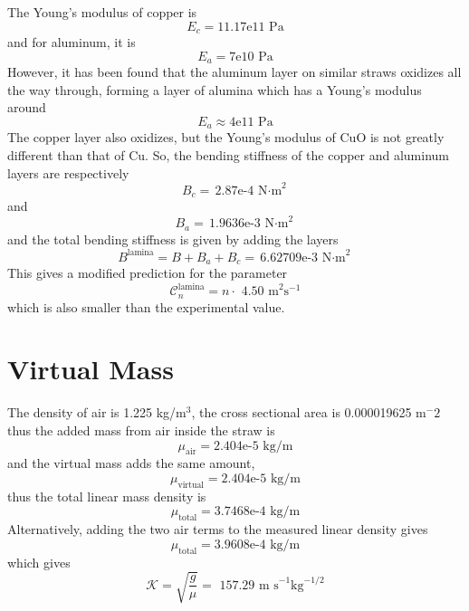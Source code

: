 \documentclass[twoside]{article}
\begin{document}
\begin{multicols}{2}
The Young's modulus of copper is
\begin{equation}
E_c = 1\text{1.17e11 Pa} 
\end{equation}
and for aluminum, it is
\begin{equation}
E_a = \text{7e10 Pa} 
\end{equation}
However, it has been found that the aluminum layer on similar straws oxidizes all the way through, forming a layer of alumina which has a Young's modulus around
\begin{equation}
E_a \approx \text{4e11 Pa} 
\end{equation}
The copper layer also oxidizes, but the Young's modulus of CuO is not greatly different than that of Cu.
So, the bending stiffness of the copper and aluminum layers are respectively
\begin{equation}
B_c = \text{2.87e-4  N$\cdot$m}^2
\end{equation}
and
\begin{equation}
B_a = \text{1.9636e-3  N$\cdot$m}^2
\end{equation}
and the total bending stiffness is given by adding the layers
\begin{equation}
B^\text{lamina} = B + B_a + B_c = \text{6.62709e-3  N$\cdot$m}^2
\label{eq:totb}
\end{equation}
This gives a modified prediction for the parameter
\begin{equation}
\boxed{
	\mathcal{C}^\text{lamina}_n =  n\cdot\text{ 4.50 m}^{2} \text{s}^{-1}
}
\end{equation} 
which is also smaller than the experimental value.



\section{Virtual Mass}
The density of air is 1.225 kg/m$^3$, the cross sectional area is 0.000019625 m$^-2$ thus the added mass from air inside the straw is 
\begin{equation}
\mu_{\text{air}} = \text{2.404e-5  kg/m}
\end{equation}
and the virtual mass adds the same amount,
\begin{equation}
\mu_{\text{virtual}} = \text{2.404e-5  kg/m}
\end{equation}
thus the total linear mass density is 
\begin{equation}
\mu_{\text{total}} = \text{3.7468e-4  kg/m}
\end{equation}
Alternatively, adding the two air terms to the measured linear density gives
\begin{equation}
\mu_{\text{total}} = \text{3.9608e-4  kg/m}
\end{equation}
which gives 
\begin{equation}
\boxed{
	\mathcal{K} = \sqrt{\frac{g}{\mu}} = \text{ 157.29  m s}^{-1} \text{kg}^{-1/2}
}
\end{equation}  



\end{multicols}
\end{document}
